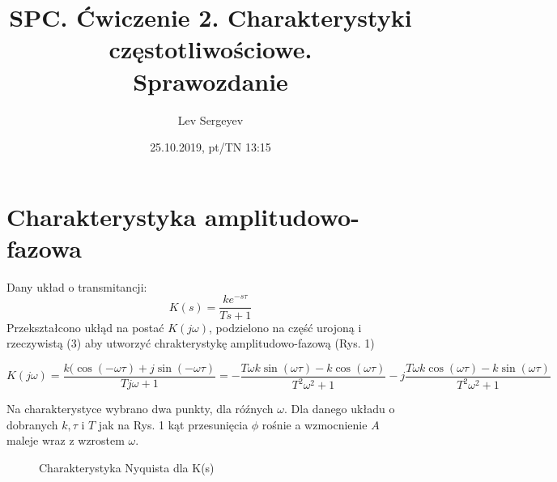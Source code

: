 \documentclass{article}
\author{Lev Sergeyev}
\title{SPC. Ćwiczenie 2. Charakterystyki częstotliwościowe. \\ Sprawozdanie}
\date{25.10.2019, pt/TN 13:15}
\begin{document}
\maketitle



\section{Charakterystyka amplitudowo-fazowa}
\par
Dany układ o transmitancji:
\begin{equation}
K(s)=\frac{ke^{-s\tau}}{Ts+1} 
\end{equation}
Przekształcono ukłąd na postać \( K(j\omega)\), podzielono na część urojoną i rzeczywistą (3) aby utworzyć chrakterystykę amplitudowo-fazową (Rys. 1)

\begin{equation}
K(j\omega)=
\frac{k(\cos(-\omega\tau)+j\sin(-\omega\tau)}{T j\omega+1}=
-\frac{T\omega k \sin(\omega\tau) -k \cos(\omega\tau)}{T^2\omega^2+1}
-j\frac{T\omega k \cos(\omega\tau) -k \sin(\omega\tau)}{T^2\omega^2+1}
\end{equation}


Na charakterystyce wybrano dwa punkty, dla róźnych \(\omega\).
Dla danego układu o dobranych \(k, \tau\) i \(T\) jak na Rys. 1 kąt przesunięcia \(\phi\) rośnie a wzmocnienie \(A\) maleje wraz z wzrostem \(\omega\).

\begin{figure}[h]
\centering
{}
\caption{Charakterystyka Nyquista dla K(s)}
\end{figure}
\end{document}

